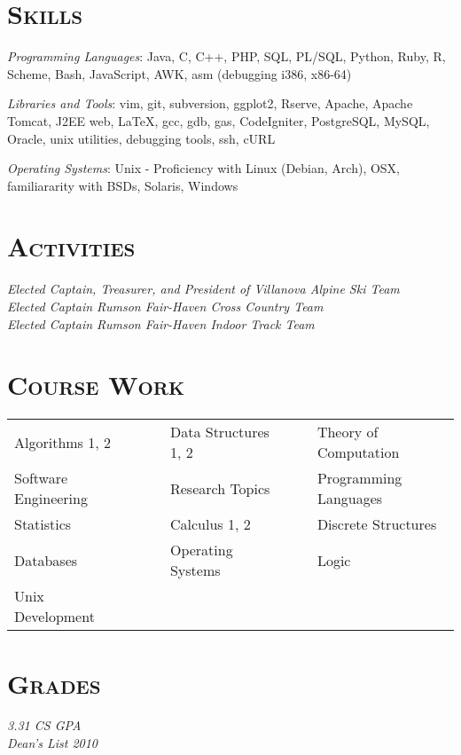 \documentclass[line,margin]{resume}
\begin{document}
\begin{resume}

\section{\textsc{Skills}}

\emph{Programming Languages}: Java, C, C++, PHP, SQL, PL/SQL, Python, Ruby, R,
Scheme, Bash, JavaScript, AWK, asm (debugging i386, x86-64)

\emph{Libraries and Tools}: vim, git, subversion, ggplot2, Rserve, Apache,
Apache Tomcat, J2EE web, LaTeX, gcc, gdb, gas, CodeIgniter, PostgreSQL,
MySQL, Oracle, unix utilities, debugging tools, ssh, cURL

\emph{Operating Systems}: Unix - Proficiency with Linux (Debian, Arch), OSX,
familiararity with BSDs, Solaris, Windows


\section{\textsc{Activities}}

\emph{Elected Captain, Treasurer, and President of Villanova Alpine Ski Team} \\
\emph{Elected Captain Rumson Fair-Haven Cross Country Team} \\
\emph{Elected Captain Rumson Fair-Haven Indoor Track Team} \\
\newpage

\section{\textsc{Course Work}}
  \begin{tabular}{lllll}

  Algorithms 1, 2        & \ \ & Data Structures 1, 2& \ \ & Theory of Computation \\
  Software Engineering   & \ \ & Research Topics     & \ \ & Programming Languages \\
  Statistics             & \ \ & Calculus 1, 2       & \ \ & Discrete Structures \\
  Databases              & \ \ & Operating Systems   & \ \ & Logic \\
  Unix Development       & \ \ &

  \end{tabular}

\section{\textsc{Grades}}
\emph{3.31 CS GPA} \\
\emph{Dean's List 2010}

\end{resume}
\end{document}

